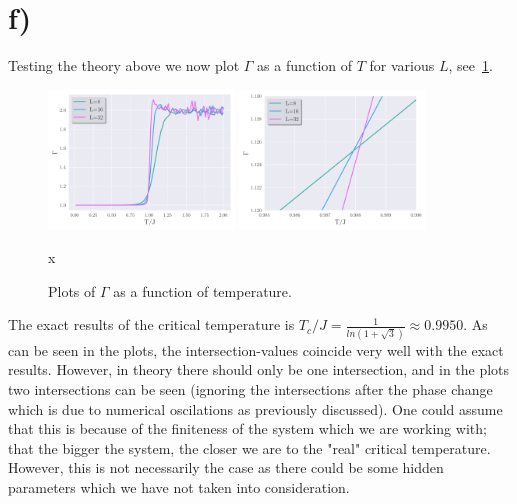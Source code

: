 \section*{f)}
    Testing the theory above we now plot $\Gamma$ as a function of $T$ for various $L$, see~\cref{fig:gamma_T}. 
    \begin{figure}
        \centering
        \includegraphics[width=0.44\textwidth]{../figs/gamma_T.pdf}
        \includegraphics[width=0.44\textwidth]{../figs/gamma_T_zoom.pdf}
        \caption{Plots of $\Gamma$ as a function of temperature.}x
        \label{fig:gamma_T}
    \end{figure}
    The exact results of the critical temperature is $T_c/J = \frac{1}{ln(1+\sqrt{3})} \approx 0.9950$. As can be seen in the plots, the intersection-values coincide very well with the exact results. However, in theory there should only be one intersection, and in the plots two intersections can be seen (ignoring the intersections after the phase change which is due to numerical oscilations as previously discussed). One could assume that this is because of the finiteness of the system which we are working with; that the bigger the system, the closer we are to the "real" critical temperature. However, this is not necessarily the case as there could be some hidden parameters which we have not taken into consideration.  